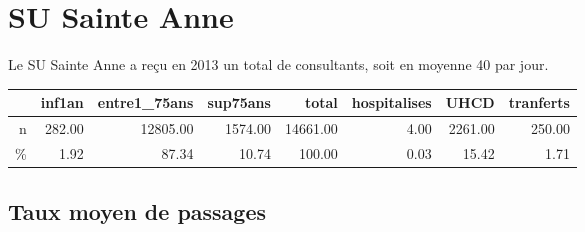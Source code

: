 \documentclass[12pt,english,french,twoside]{book}\usepackage[]{graphicx}\usepackage[]{color}
\begin{document}
\chapter{SU Sainte Anne}





Le SU Sainte Anne a reçu en 2013 un total de  consultants, soit en moyenne 40 par jour.

\begin{table}[ht]
\centering
\begin{tabular}{rrrrrrrr}
  \hline
 & inf1an & entre1\_75ans & sup75ans & total & hospitalises & UHCD & tranferts \\ 
  \hline
n & 282.00 & 12805.00 & 1574.00 & 14661.00 & 4.00 & 2261.00 & 250.00 \\ 
  \% & 1.92 & 87.34 & 10.74 & 100.00 & 0.03 & 15.42 & 1.71 \\ 
   \hline
\end{tabular}
\end{table}



\section{Taux moyen de passages}
\end{document}
